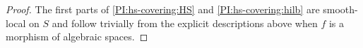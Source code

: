 \documentclass[10pt]{amsart}
\theoremstyle{plain}
\theoremstyle{definition}
\newcommand{\Spec}{{\rm Spec \,}}
\begin{document}
\begin{proof}
	The first parts of \eqref{PI:hs-covering:HS} and
	\eqref{PI:hs-covering:hilb} are smooth-local on $S$ and follow
	trivially from the explicit descriptions above when $f$ is a
	morphism of algebraic spaces. %

\end{proof}
\end{document}
